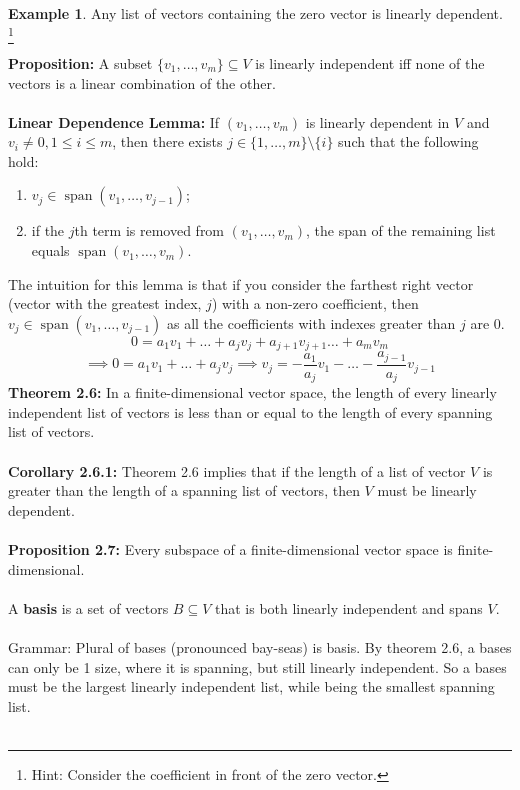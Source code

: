 \documentclass{article}
\DeclareMathOperator{\Span}{span}
\theoremstyle{definition}
\newtheorem{ex}{Example}[section]
\begin{document}
\begin{ex}
Any list of vectors containing the zero vector is linearly dependent. \footnote{Hint: Consider the coefficient in front of the zero vector.}
\end{ex}
\noindent \textbf{Proposition:} A subset $\{v_1 , \dots, v_m\} \subseteq V$ is linearly independent iff none of the vectors is a linear combination of the other. \\ \\
\noindent \textbf{Linear Dependence Lemma:} If $(v_1 , \dots, v_m)$ is linearly dependent in $V$ and $v_i \neq 0,1 \leq i \leq m$, then there exists $j \in \{1, \dots, m\} \setminus \{i\}$ such that the following hold: \begin{enumerate}
    \item $v_j \in \Span(v_1, \dots, v_{j-1})$;
    \item if the $j$th term is removed from $(v_1, \dots, v_m)$, the span of the remaining list equals $\Span(v_1, \dots, v_m)$.
\end{enumerate}
The intuition for this lemma is that if you consider the farthest right vector (vector with the greatest index, $j$) with a non-zero coefficient, then $v_j \in \Span(v_1, \dots, v_{j-1})$ as all the coefficients with indexes greater than $j$ are 0. $$0 = a_1v_1 + \dots + a_jv_j + a_{j + 1}v_{j + 1} \dots + a_mv_m$$ $$\implies 0 = a_1v_1 + \dots + a_jv_j \implies v_j = -\frac{a_1}{a_j}v_1 - \dots -\frac{a_{j - 1}}{a_j}v_{j - 1}$$
\textbf{Theorem 2.6:} In a finite-dimensional vector space, the length of every linearly independent list of vectors is less than or equal to the length of every spanning list of vectors. \\ \\
\textbf{Corollary 2.6.1:} Theorem 2.6 implies that if the length of a list of vector $V$ is greater than the length of a spanning list of vectors, then $V$ must be linearly dependent. \\ \\
\textbf{Proposition 2.7:} Every subspace of a finite-dimensional vector space is finite-dimensional. \\ \\
A \textbf{basis} is a set of vectors $B \subseteq V$ that is both linearly independent and spans $V$. \\ \\
Grammar: Plural of bases (pronounced bay-seas) is basis. By theorem 2.6, a bases can only be 1 size, where it is spanning, but still linearly independent. So a bases must be the largest linearly independent list, while being the smallest spanning list. \\ \\
\end{document}
